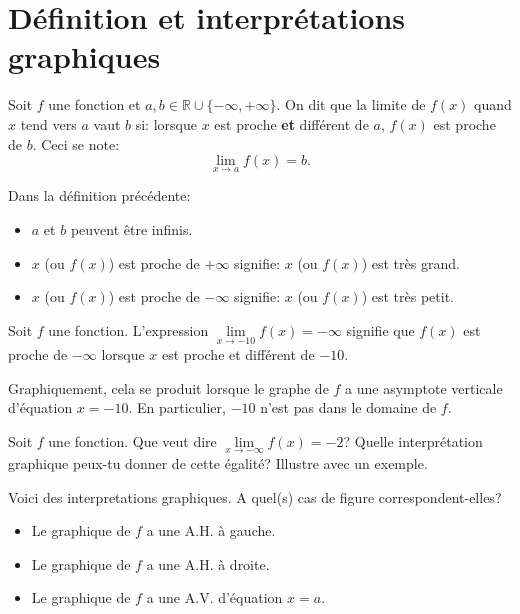\documentclass[a4paper,12pt]{report}
\newcommand{\IR}{\mathbb{R}}
\begin{document}
\section{Définition et interprétations graphiques}
\label{sec:org69eec05}
\begin{definition}
Soit \(f\) une fonction et \(a,b\in\IR\cup\{-\infty,+\infty\}\). On dit
que la limite de \(f(x)\) quand \(x\) tend vers \(a\) vaut \(b\) si: lorsque
\(x\) est proche \textbf{et} différent de \(a\), \(f(x)\) est proche de \(b\). Ceci se note:
\[
\lim\limits_{x\to a}f(x)=b.
\]
\end{definition}

\begin{remarque}
Dans la définition précédente:
\begin{itemize}
\item \(a\) et \(b\) peuvent être infinis.
\item \(x\) (ou \(f(x)\)) est proche de \(+\infty\) signifie:
\(x\) (ou \(f(x)\)) est très grand.
\item \(x\) (ou \(f(x)\)) est proche de \(-\infty\) signifie:
\(x\) (ou \(f(x)\)) est très petit.
\end{itemize}
\end{remarque}

\begin{exemple}
Soit \(f\) une fonction. L'expression \(\lim\limits_{x\to -10}f(x)=-\infty\)
signifie que  \(f(x)\) est proche de \(-\infty\) lorsque \(x\) est proche et
différent de \(-10\).

Graphiquement, cela se produit lorsque le graphe de \(f\) a une
asymptote verticale d'équation \(x=-10\). En particulier, \(-10\) n'est
pas dans le domaine de \(f\).

\begin{center}

\end{center}
\end{exemple}


\begin{exercice}
Soit \(f\) une fonction. Que veut dire \(\lim\limits_{x\to -\infty}
f(x)=-2\)? Quelle interprétation graphique peux-tu donner de cette
égalité? Illustre avec un exemple.
\end{exercice}

\begin{exercice}
Voici des interpretations graphiques. A quel(s) cas de figure
correspondent-elles?

\begin{itemize}
\item Le graphique de \(f\) a une A.H. à gauche.
\item Le graphique de \(f\) a une A.H. à droite.
\item Le graphique de \(f\) a une A.V. d'équation \(x=a\).
\end{itemize}
\end{exercice}
\end{document}
